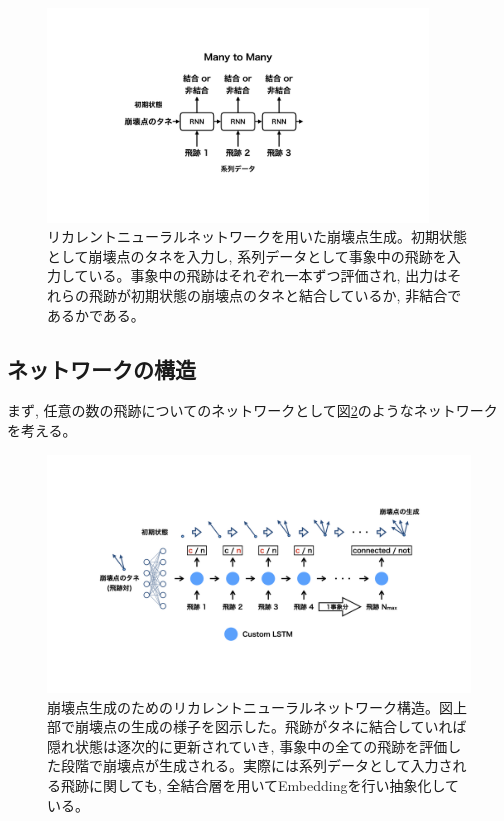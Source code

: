 \begin{figure}[htbp]
 \centering
 \includegraphics[trim = 200 150 200 150, width=0.9\textwidth, clip]{Figure/3Networks/3-4-0-1VertexProductionwithRNN.png}
 \caption[リカレントニューラルネットワークを用いた崩壊点生成]{リカレントニューラルネットワークを用いた崩壊点生成。初期状態として崩壊点のタネを入力し, 系列データとして事象中の飛跡を入力している。事象中の飛跡はそれぞれ一本ずつ評価され, 出力はそれらの飛跡が初期状態の崩壊点のタネと結合しているか, 非結合であるかである。}
 \label{3-4-0-1VertexProductionwithRNN}
\end{figure}


\subsection{ネットワークの構造} \label{Net:VLSTM:StructureofVLSTM}

まず, 任意の数の飛跡についてのネットワークとして図\ref{3-4-1-1SimpleVLSTM}のようなネットワークを考える。

\begin{figure}[htbp]
 \centering
 \includegraphics[trim = 100 200 100 200, width=1.0\textwidth, clip]{Figure/3Networks/3-4-1-1SimpleVLSTM.png}
 \caption[崩壊点生成のためのリカレントニューラルネットワーク構造]{崩壊点生成のためのリカレントニューラルネットワーク構造。図上部で崩壊点の生成の様子を図示した。飛跡がタネに結合していれば隠れ状態は逐次的に更新されていき, 事象中の全ての飛跡を評価した段階で崩壊点が生成される。実際には系列データとして入力される飛跡に関しても, 全結合層を用いてEmbeddingを行い抽象化している。}
 \label{3-4-1-1SimpleVLSTM}
\end{figure}


